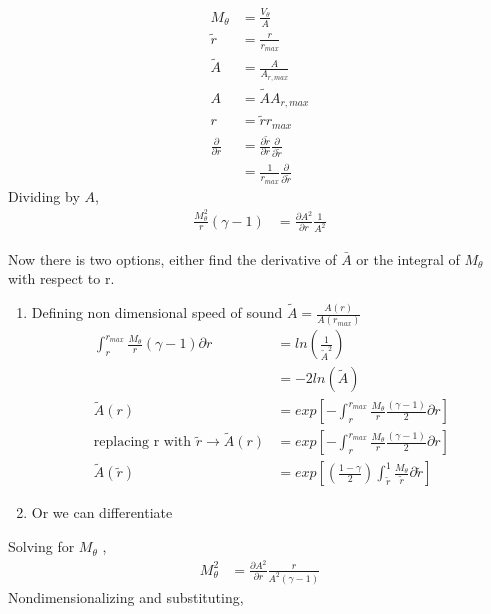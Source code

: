 \documentclass[a4paper]{report}
\begin{document}
\begin{align*}
    M_{\theta} &= \frac{V_{\theta}}{A} \\ 
    \widetilde{r} &= \frac{r}{r_{max}}  \\
    \widetilde{A} &= \frac{A}{A_{r,max}}  \\
    A &= \widetilde{A}{A_{r,max}} \\
    r &= \widetilde{r}{r_{max}}\\
    \frac{\partial}{\partial r} &=
    \frac{\partial \widetilde{r}}{\partial r} \frac{\partial}{\partial \widetilde{r}}\\
                                &= \frac{1}{r_{max}}\frac{\partial}{\partial \widetilde{r}}
\end{align*}
Dividing by $A$,
\begin{align*}
    \frac{M_{\theta}^2}{r}\left(\gamma - 1\right) 
 &= \frac{\partial A^2}{\partial r} \frac{1}{A^2}
\end{align*}

Now there is two options, either find the derivative of  $\bar{A}$ or the integral of
$M_{\theta}$ with respect to r.
\begin{enumerate}
    \item
%
Defining non dimensional speed of sound $\tilde{A} = \frac{A(r)}{A(r_{max})}$
\begin{align*}
\int_{r}^{r_{max}}\frac{M_{\theta}}{r}\left(\gamma - 1\right){\partial r}  &=ln\left(\frac{1}{\tilde{A}^2}\right) \\
&= -2ln(\tilde{A})\\
\tilde{A}(r) &= exp\left[-\int_{r}^{r_{max}}\frac{M_{\theta}}{r}\frac{\left(\gamma - 1\right)}{2}{\partial r}\right] \\ \text{replacing r with }\tilde{r} \rightarrow \tilde{A}(r) &= exp\left[-\int_{r}^{r_{max}}\frac{M_{\theta}}{r}\frac{\left(\gamma - 1\right)}{2}{\partial r}\right]		\\
\tilde{A}(\tilde{r}) &= exp\left[\left(\frac{1 - \gamma}{2}\right)\int_{\tilde{r}}^{1}\frac{M_{\theta}}{\tilde{r}}{\partial \tilde{r}}\right]	
\end{align*}
\item Or we can differentiate
\end{enumerate}
Solving for $M_{\theta}$ ,
\begin{align*}
M_{\theta}^2 
&= \frac{\partial A^2}{\partial r} \frac{r}{A^2 \left(\gamma - 1\right)}
\end{align*}
Nondimensionalizing and substituting, 
\end{document}
